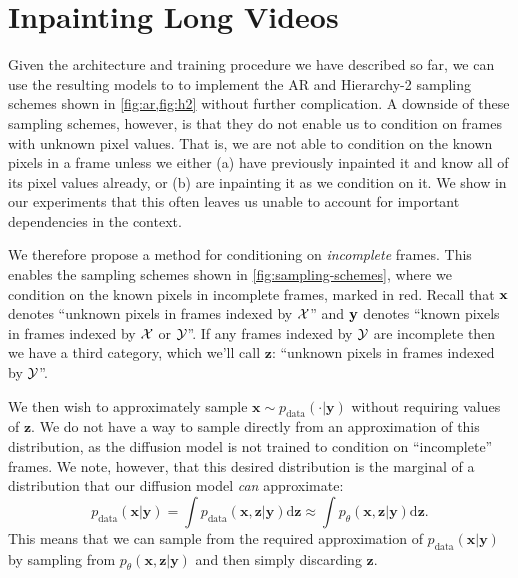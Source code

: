 \section{Inpainting Long Videos} \label{sec:future-conditioning}
Given the architecture and training procedure we have described so far, we can use the resulting models to to implement the AR and Hierarchy-2 sampling schemes shown in \cref{fig:ar,fig:h2} without further complication. A downside of these sampling schemes, however, is that they do not enable us to condition on frames with unknown pixel values. That is, we are not able to condition on the known pixels in a frame unless we either (a) have previously inpainted it and know all of its pixel values already, or (b) are inpainting it as we condition on it. We show in our experiments that this often leaves us unable to account for important dependencies in the context.



We therefore propose a method for conditioning on \textit{incomplete} frames. This enables the sampling schemes shown in \cref{fig:sampling-schemes}, where we condition on the known pixels in incomplete frames, marked in \textcolor{observedfuturecolor}{red}. Recall that $\mathbf{x}$ denotes ``unknown pixels in frames indexed by $\mathcal{X}$'' and $\mathbf{y}$ denotes ``known pixels in frames indexed by $\mathcal{X}$ or $\mathcal{Y}$''. If any frames indexed by $\mathcal{Y}$ are incomplete then we have a third category, which we'll call $\mathbf{z}$: ``unknown pixels in frames indexed by $\mathcal{Y}$''.


We then wish to approximately sample $\mathbf{x} \sim p_\text{data}(\cdot | \mathbf{y})$ without requiring values of $\mathbf{z}$. We do not have a way to sample directly from an approximation of this distribution, as the diffusion model is not trained to condition on ``incomplete'' frames. We note, however, that this desired distribution is the marginal of a distribution that our diffusion model \textit{can} approximate:
\begin{equation}
    p_\text{data}(\mathbf{x}|\mathbf{y}) = \int p_\text{data}(\mathbf{x},\mathbf{z}|\mathbf{y}) \mathrm{d}\mathbf{z} \approx \int p_\theta(\mathbf{x},\mathbf{z}|\mathbf{y}) \mathrm{d}\mathbf{z}.
\end{equation}
This means that we can sample from the required approximation of $p_\text{data}(\mathbf{x}|\mathbf{y})$ by sampling from $p_\theta(\mathbf{x},\mathbf{z}|\mathbf{y})$ and then simply discarding $\mathbf{z}$.

